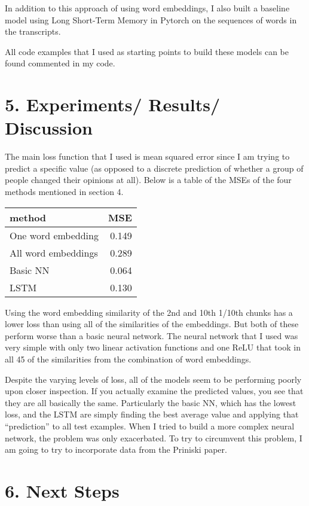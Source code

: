 \documentclass[12pt,]{article}
\begin{document}
In addition to this approach of using word embeddings, I also built a
baseline model using Long Short-Term Memory in Pytorch on the sequences
of words in the transcripts.

All code examples that I used as starting points to build these models
can be found commented in my code.

\hypertarget{experiments-results-discussion}{%
\section{5. Experiments/ Results/
Discussion}\label{experiments-results-discussion}}

The main loss function that I used is mean squared error since I am
trying to predict a specific value (as opposed to a discrete prediction
of whether a group of people changed their opinions at all). Below is a
table of the MSEs of the four methods mentioned in section 4.

\begin{longtable}[]{@{}lr@{}}
\toprule
method & MSE\tabularnewline
\midrule
\endhead
One word embedding & 0.149\tabularnewline
All word embeddings & 0.289\tabularnewline
Basic NN & 0.064\tabularnewline
LSTM & 0.130\tabularnewline
\bottomrule
\end{longtable}

Using the word embedding similarity of the 2nd and 10th 1/10th chunks
has a lower loss than using all of the similarities of the embeddings.
But both of these perform worse than a basic neural network. The neural
network that I used was very simple with only two linear activation
functions and one ReLU that took in all 45 of the similarities from the
combination of word embeddings.

Despite the varying levels of loss, all of the models seem to be
performing poorly upon closer inspection. If you actually examine the
predicted values, you see that they are all basically the same.
Particularly the basic NN, which has the lowest loss, and the LSTM are
simply finding the best average value and applying that ``prediction''
to all test examples. When I tried to build a more complex neural
network, the problem was only exacerbated. To try to circumvent this
problem, I am going to try to incorporate data from the Priniski paper.

\hypertarget{next-steps}{%
\section{6. Next Steps}\label{next-steps}}
\end{document}
